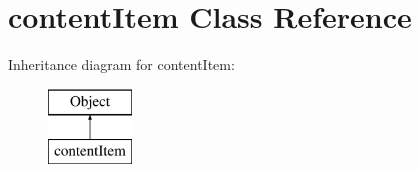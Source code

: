 \hypertarget{classcontentItem}{\section{content\+Item Class Reference}
\label{classcontentItem}
}
Inheritance diagram for content\+Item\+:\begin{figure}[H]
\begin{center}
\leavevmode
\includegraphics[height=2.000000cm]{classcontentItem}
\end{center}
\end{figure}
